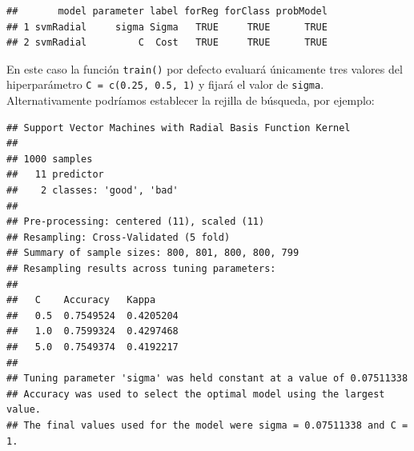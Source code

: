 \documentclass[
  spanish,
]{book}
\newenvironment{Shaded}{\begin{snugshade}}{\end{snugshade}}
\newcommand{\CommentTok}[1]{\textcolor[rgb]{0.56,0.35,0.01}{\textit{#1}}}
\newcommand{\DataTypeTok}[1]{\textcolor[rgb]{0.13,0.29,0.53}{#1}}
\newcommand{\DecValTok}[1]{\textcolor[rgb]{0.00,0.00,0.81}{#1}}
\newcommand{\FloatTok}[1]{\textcolor[rgb]{0.00,0.00,0.81}{#1}}
\newcommand{\KeywordTok}[1]{\textcolor[rgb]{0.13,0.29,0.53}{\textbf{#1}}}
\newcommand{\NormalTok}[1]{#1}
\newcommand{\OperatorTok}[1]{\textcolor[rgb]{0.81,0.36,0.00}{\textbf{#1}}}
\newcommand{\OtherTok}[1]{\textcolor[rgb]{0.56,0.35,0.01}{#1}}
\newcommand{\StringTok}[1]{\textcolor[rgb]{0.31,0.60,0.02}{#1}}
\theoremstyle{break}
\theoremstyle{definition}
\theoremstyle{definition}
\theoremstyle{definition}
\theoremstyle{remark}
\begin{document}
\begin{verbatim}
##       model parameter label forReg forClass probModel
## 1 svmRadial     sigma Sigma   TRUE     TRUE      TRUE
## 2 svmRadial         C  Cost   TRUE     TRUE      TRUE
\end{verbatim}

En este caso la función \texttt{train()} por defecto evaluará únicamente tres valores del hiperparámetro \texttt{C\ =\ c(0.25,\ 0.5,\ 1)} y fijará el valor de \texttt{sigma}.
Alternativamente podríamos establecer la rejilla de búsqueda, por ejemplo:

\begin{Shaded}
\end{Shaded}

\begin{verbatim}
## Support Vector Machines with Radial Basis Function Kernel 
## 
## 1000 samples
##   11 predictor
##    2 classes: 'good', 'bad' 
## 
## Pre-processing: centered (11), scaled (11) 
## Resampling: Cross-Validated (5 fold) 
## Summary of sample sizes: 800, 801, 800, 800, 799 
## Resampling results across tuning parameters:
## 
##   C    Accuracy   Kappa    
##   0.5  0.7549524  0.4205204
##   1.0  0.7599324  0.4297468
##   5.0  0.7549374  0.4192217
## 
## Tuning parameter 'sigma' was held constant at a value of 0.07511338
## Accuracy was used to select the optimal model using the largest value.
## The final values used for the model were sigma = 0.07511338 and C = 1.
\end{verbatim}
\end{document}
